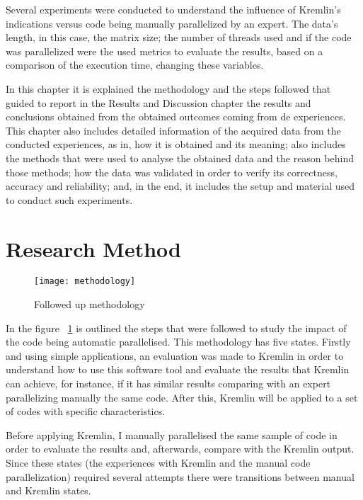 Several experiments were conducted to understand the influence of Kremlin's indications versus code being manually parallelized  by an expert. The data's length, in this case, the matrix size; the number of threads used and if the code was parallelized were the used metrics to evaluate the results, based on a comparison of the execution time, changing these variables.

In this chapter it is explained the methodology and the steps followed that guided to report in the Results and Discussion chapter the results and conclusions obtained from the obtained outcomes coming from de experiences. This chapter also includes  detailed information of the acquired data from the conducted experiences, as in, how it is obtained and its meaning; also includes the methods that were used to analyse the obtained data and the reason behind those methods; how the data was validated in order to verify its correctness, accuracy and reliability; and, in the end, it includes the setup and material used to conduct such experiments.



\section{Research Method}

\begin{figure}[t]
	\begin{center}
		\leavevmode
		\texttt{[image: methodology]}
		\caption{Followed up methodology}
		\label{fig:method}
	\end{center}
\end{figure}


In the  figure ~\ref{fig:method} is outlined the steps that were followed to study the impact of the code being automatic parallelised. This methodology has five states. Firstly and using simple applications, an evaluation was made to Kremlin in order  to understand how to use this software tool and evaluate the results that Kremlin can achieve, for instance, if it has similar results comparing with an expert parallelizing manually the same code. After this, Kremlin will be applied to a set of codes with specific characteristics.

Before applying Kremlin, I manually parallelised the same sample of code in order to evaluate the results and, afterwards, compare with the Kremlin output. Since these states (the experiences with Kremlin and the manual code parallelization) required several attempts there were transitions between manual and Kremlin states. 

